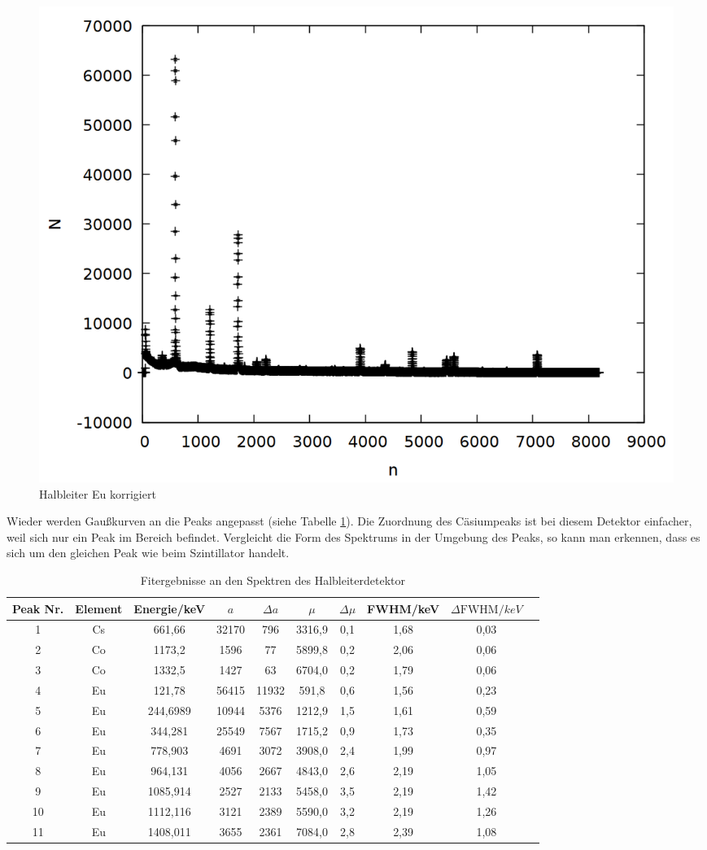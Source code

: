 \begin{figure}[!h]
\centering
\includegraphics[width=0.7\linewidth]{data/ge_eu.png}
\caption{Halbleiter Eu korrigiert}
\label{fig:ge_eu}
\end{figure}

Wieder werden Gaußkurven an die Peaks angepasst (siehe Tabelle \ref{tab:ge}). Die Zuordnung des Cäsiumpeaks ist bei diesem Detektor einfacher, weil sich nur ein Peak im Bereich befindet. Vergleicht die Form des Spektrums in der Umgebung des Peaks, so kann man erkennen, dass es sich um den gleichen Peak wie beim Szintillator handelt.\\

\newpage

\begin{table}[h]
\caption{Fitergebnisse an den Spektren des Halbleiterdetektor}
\begin{tabular}{cccccccccc}
\toprule
Peak Nr. & Element & Energie/\si{keV}& $a$ & $\Delta a$ & $\mu$ & $\Delta \mu$ & FWHM/\si{keV} & $\Delta \text{FWHM}/\si{keV}$\\
\midrule 
1	&	Cs	&	661,66	&	32170	&	796	&	3316,9	&	0,1	&	1,68	&	0,03\\
2	&	Co	&	1173,2	&	1596	&	77	&	5899,8	&	0,2	&	2,06	&	0,06\\
3	&	Co	&	1332,5	&	1427	&	63	&	6704,0	&	0,2	&	1,79	&	0,06\\
4	&	Eu	&	121,78	&	56415	&	11932	&	591,8	&	0,6	&	1,56	&	0,23\\
5	&	Eu	&	244,6989	&	10944	&	5376	&	1212,9	&	1,5	&	1,61	&	0,59\\
6	&	Eu	&	344,281	&	25549	&	7567	&	1715,2	&	0,9	&	1,73	&	0,35\\
7	&	Eu	&	778,903	&	4691	&	3072	&	3908,0	&	2,4	&	1,99	&	0,97\\
8	&	Eu	&	964,131	&	4056	&	2667	&	4843,0	&	2,6	&	2,19	&	1,05\\
9	&	Eu	&	1085,914	&	2527	&	2133	&	5458,0	&	3,5	&	2,19	&	1,42\\
10	&	Eu	&	1112,116	&	3121	&	2389	&	5590,0	&	3,2	&	2,19	&	1,26\\
11	&	Eu	&	1408,011	&	3655	&	2361	&	7084,0	&	2,8	&	2,39	&	1,08\\
\bottomrule
\end{tabular}
\label{tab:ge}
\end{table}

